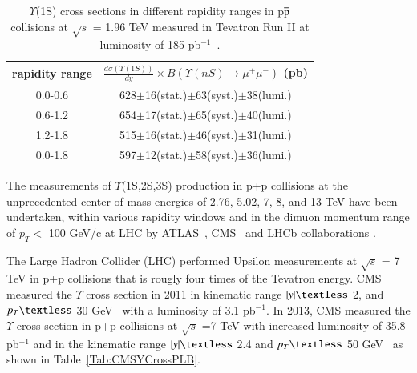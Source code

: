 \begin{table}
 \begin{center}
   \caption[]{ $\Upsilon$(1S) cross sections in different rapidity ranges in p$\overline{\rm p}$
    collisions at $\surd s$ = 1.96 TeV measured in 
    Tevatron Run II at luminosity of 185 pb$^{-1}$~\cite{D0:2005klj}. }
\label{Tab:YCrossD0RunII}
\begin{tabular}{cc} 
\hline 
\hline
rapidity range             &$\frac{d\sigma(\Upsilon(1S))}{dy}\times B(\Upsilon(nS)\rightarrow\mu^{+}\mu^{-})$ (pb)    \\              
\hline
0.0-0.6                   &628$\pm$16(stat.)$\pm$63(syst.)$\pm$38(lumi.)\\
0.6-1.2                   &654$\pm$17(stat.)$\pm$65(syst.)$\pm$40(lumi.)\\
1.2-1.8                   &515$\pm$16(stat.)$\pm$46(syst.)$\pm$31(lumi.)\\
0.0-1.8                   &597$\pm$12(stat.)$\pm$58(syst.)$\pm$36(lumi.)\\
\hline
\hline
\end{tabular}
\end{center}
\end{table}

The measurements of $\Upsilon$(1S,2S,3S) production in p+p collisions at the
unprecedented center of mass energies of 2.76, 5.02, 7, 8, and 13 TeV have been undertaken,
within various rapidity windows and in the dimuon momentum range of
$p_{T}<$ 100 GeV/c at LHC by
ATLAS~\cite{ATLAS:2011nal,ATLAS:2012lmu},
CMS~\cite{CMS:2013qur,CMS:2017dju} and LHCb collaborations \cite{LHCb:2018yzj}.

 The Large Hadron Collider (LHC) performed Upsilon measurements at 
$\surd s$ = 7 TeV in p+p collisions that is rougly four times of the Tevatron energy. 
CMS measured the $\Upsilon$ cross section in 2011 in kinematic range 
$|y|\textless$ 2, and $p_{T} \textless$ 30 GeV~\cite{CMS:2010wld} 
with a luminosity of 3.1 pb$^{-1}$.
  In 2013, CMS measured the $\Upsilon$ cross section in p+p collisions at $\surd s$ =7 TeV
with increased luminosity of 35.8 pb$^{-1}$ and in the kinematic range
$|y|\textless$ 2.4 and $p_{T}\textless$ 50 GeV~\cite{CMS:2015xqv} as shown in
Table~\ref{Tab:CMSYCrossPLB}.



